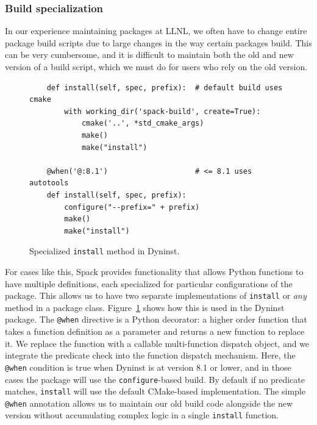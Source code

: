 \subsubsection{Build specialization}

In our experience maintaining packages at LLNL, we often have to change
entire package build scripts due to large changes in the way certain packages build.
This can be very cumbersome, and it is difficult to maintain both the old and new
version of a build script, which we must do for users who rely on the old version.


%
\begin{figure}
\begin{verbatim}
    def install(self, spec, prefix):  # default build uses cmake
        with working_dir('spack-build', create=True):
            cmake('..', *std_cmake_args)
            make()
            make("install")

    @when('@:8.1')                    # <= 8.1 uses autotools
    def install(self, spec, prefix):
        configure("--prefix=" + prefix)
        make()
        make("install")
\end{verbatim}
\caption{
    Specialized {\tt install} method in Dyninst.
	\label{fig:specialization}
}
\end{figure}

For cases like this, Spack provides functionality that allows Python functions to have
multiple definitions, each specialized for particular configurations of the package.
This allows us to have two separate implementations of {\tt install} or {\it any} method
in a package class. Figure~\ref{fig:specialization} shows how this is used in the Dyninst
package.  The {\tt @when} directive is a Python decorator: a higher order function that
takes a function definition as a parameter and returns a new function to replace it.
We replace the function with a callable multi-function dispatch object, and we
integrate the predicate check into the function dispatch mechanism.  Here, the
{\tt @when} condition is true when Dyninst is at version 8.1 or lower, and in those cases
the package will use the {\tt configure}-based build.  By default if no predicate matches,
{\tt install} will use the default CMake-based implementation. The simple {\tt @when}
annotation allows us to maintain our old build code alongside the new version without
accumulating complex logic in a single {\tt install} function.
